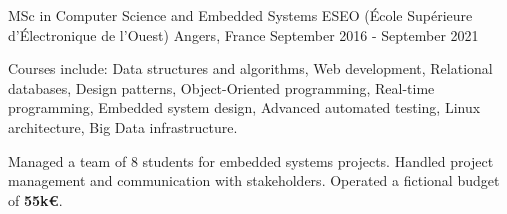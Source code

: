 

\begin{cventries}

  \cventry
    {MSc in Computer Science and Embedded Systems} %
    {ESEO (École Supérieure d'Électronique de l'Ouest)} %
    {Angers, France} %
    {September 2016 - September 2021} %
    {
      \begin{cvitems} %
        \item {Courses include: Data structures and algorithms, Web development, Relational databases, Design patterns, Object-Oriented programming, Real-time programming, Embedded system design, Advanced automated testing, Linux architecture, Big Data infrastructure.}
        \item {Managed a team of 8 students for embedded systems projects. Handled project management and communication with stakeholders. Operated a fictional budget of \textbf{55k€}.}
      \end{cvitems}
    }

\end{cventries}
